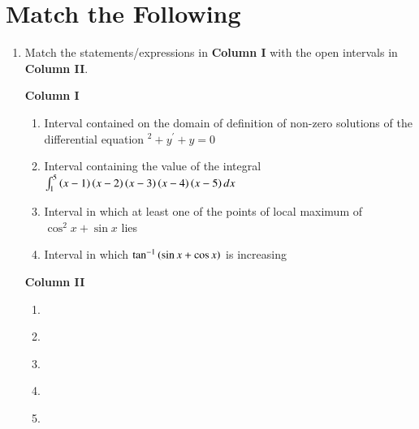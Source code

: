 \documentclass[journal]{IEEEtran}
\begin{document}
\section{Match the Following}
\begin{enumerate}
\item Match the statements/expressions in \textbf{Column I} with the open intervals in \textbf{Column II}.

	\hfill{}

	\begin{minipage}[t]{0.5\textwidth}
		\textbf{Column I}
		\begin{enumerate}[label=\brak{\Alph*}]
	\item Interval contained on the domain of definition of non-zero solutions of the differential equation $^2+y^{\prime}+y=0$
	\item Interval containing the value of the integral \\$\int_1^5 \left(x-1\right)\left(x-2\right)\left(x-3\right)\left(x-4\right)\left(x-5\right)dx$
	\item Interval in which at least one of the points of local maximum of $\cos^2 x +\sin x$ lies
	\item Interval in which $\tan^{-1}\left(\sin x + \cos x\right)$ is increasing 
	\end{enumerate}
	\end{minipage}
		\begin{minipage}[t]{0.5\textwidth}
			\textbf{Column II}
			\begin{enumerate}[label=\brak{\alph*}]\addtocounter{enumii}{15}
			\item {} \\
			\item {} \\
			\item {} \\
			\item {} \\
			\item \brak{-\pi, \pi} \\
	\end{enumerate}
	\end{minipage}
\end{enumerate}
\end{document}
